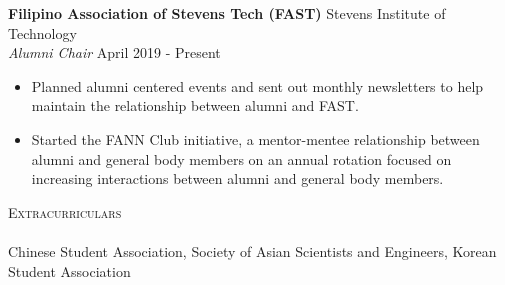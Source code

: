 \documentclass[10pt]{article}
\newcommand{\lineunder} {
    \vspace*{-8pt} \\
    \hspace*{-18pt} \hrulefill \\
}
\newcommand{\header} [1] {
    {\hspace*{-18pt}\vspace*{6pt} \textsc{#1}}
    \vspace*{-6pt} \lineunder
}
\begin{document}
\textbf{Filipino Association of Stevens Tech (FAST)} \hfill Stevens Institute of Technology\\
\textit{Alumni Chair} \hfill April 2019 - Present\\
\vspace{-1mm}
\begin{itemize} \itemsep 1pt
	\item Planned alumni centered events and sent out monthly newsletters to help maintain the relationship between alumni and FAST.
	\item Started the FANN Club initiative, a mentor-mentee relationship between alumni and general body members on an annual rotation focused on increasing interactions between alumni and general body members.
\end{itemize}
\header{Extracurriculars}
Chinese Student Association, Society of Asian Scientists and Engineers, Korean Student Association
\end{document}
